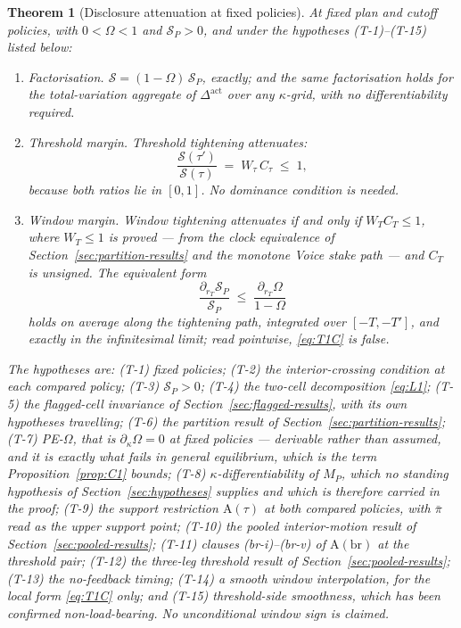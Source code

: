 \documentclass[11pt]{article}
\newtheorem{theorem}{Theorem}
\newcommand{\Dact}{\Delta^{\mathrm{act}}}
\newcommand{\Atau}{\mathrm{A}(\tau)}
\newcommand{\Abr}{\mathrm{A}(\mathrm{br})}
\begin{document}
\begin{theorem}[Disclosure attenuation at fixed policies]
\label{thm:T1}
At fixed plan and cutoff policies, with $0 < \Omega < 1$ and $\mathcal S_P > 0$, and under the
hypotheses (T-1)--(T-15) listed below:
\begin{enumerate}[label=(\Alph*),leftmargin=2.4em,itemsep=3pt]
\item \emph{Factorisation.} $\mathcal S = (1-\Omega)\,\mathcal S_P$, exactly; and the same
  factorisation holds for the total-variation aggregate of $\Dact$ over any $\kappa$-grid, with no
  differentiability required.
\item \emph{Threshold margin.} Threshold tightening attenuates:
  \begin{equation}
  \label{eq:T1B}
  \frac{\mathcal S(\tau')}{\mathcal S(\tau)} \;=\; W_\tau\,C_\tau \;\le\; 1,
  \end{equation}
  because \emph{both} ratios lie in $[0,1]$. No dominance condition is needed.
\item \emph{Window margin.} Window tightening attenuates \emph{if and only if} $W_T C_T \le 1$, where
  $W_T \le 1$ is proved --- from the clock equivalence of Section~\ref{sec:partition-results} and the monotone
  Voice stake path --- and $C_T$ is \emph{unsigned}. The equivalent form
  \begin{equation}
  \label{eq:T1C}
  \frac{\partial_{r_T}\mathcal S_P}{\mathcal S_P} \;\le\; \frac{\partial_{r_T}\Omega}{1-\Omega}
  \end{equation}
  holds \emph{on average along the tightening path}, integrated over $[-T,-T']$, and exactly in the
  infinitesimal limit; read pointwise, \eqref{eq:T1C} is false.
\end{enumerate}
The hypotheses are: (T-1) fixed policies; (T-2) the interior-crossing condition at each compared
policy; (T-3) $\mathcal S_P > 0$; (T-4) the two-cell decomposition \eqref{eq:L1}; (T-5) the
flagged-cell invariance of Section~\ref{sec:flagged-results}, with its own hypotheses travelling;
(T-6) the partition result of Section~\ref{sec:partition-results}; (T-7) PE-$\Omega$, that is
$\partial_\kappa\Omega = 0$ at fixed policies --- derivable rather than assumed, and it is exactly
what fails in general equilibrium, which is the term Proposition~\ref{prop:C1} bounds; (T-8)
$\kappa$-differentiability of $M_P$, which no standing hypothesis of Section~\ref{sec:hypotheses}
supplies and which is therefore carried in the proof; (T-9) the support restriction $\Atau$ at
\emph{both} compared policies, with $\bar\pi$ read as the upper support point; (T-10) the pooled
interior-motion result of Section~\ref{sec:pooled-results}; (T-11) clauses (br-i)--(br-v) of $\Abr$
at the threshold pair; (T-12) the three-leg threshold result of Section~\ref{sec:pooled-results};
(T-13) the no-feedback timing; (T-14) a smooth window interpolation, for the local form
\eqref{eq:T1C} only; and (T-15) threshold-side smoothness, which has been confirmed
non-load-bearing. \emph{No unconditional window sign is claimed.}
\end{theorem}
\end{document}
